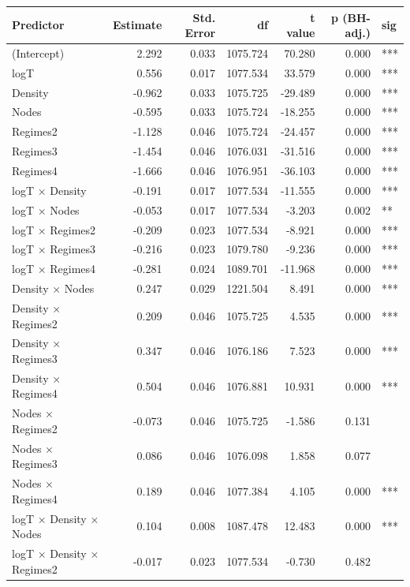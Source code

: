 \begin{table}[ht]
\centering
\begin{tabular}{lrrrrrl}
  \hline
Predictor & Estimate & Std. Error & df & t value & p (BH-adj.) & sig \\ 
  \hline
(Intercept) & 2.292 & 0.033 & 1075.724 & 70.280 & 0.000 & *** \\ 
  logT & 0.556 & 0.017 & 1077.534 & 33.579 & 0.000 & *** \\ 
  Density & -0.962 & 0.033 & 1075.725 & -29.489 & 0.000 & *** \\ 
  Nodes & -0.595 & 0.033 & 1075.724 & -18.255 & 0.000 & *** \\ 
  Regimes2 & -1.128 & 0.046 & 1075.724 & -24.457 & 0.000 & *** \\ 
  Regimes3 & -1.454 & 0.046 & 1076.031 & -31.516 & 0.000 & *** \\ 
  Regimes4 & -1.666 & 0.046 & 1076.951 & -36.103 & 0.000 & *** \\ 
  logT × Density & -0.191 & 0.017 & 1077.534 & -11.555 & 0.000 & *** \\ 
  logT × Nodes & -0.053 & 0.017 & 1077.534 & -3.203 & 0.002 & ** \\ 
  logT × Regimes2 & -0.209 & 0.023 & 1077.534 & -8.921 & 0.000 & *** \\ 
  logT × Regimes3 & -0.216 & 0.023 & 1079.780 & -9.236 & 0.000 & *** \\ 
  logT × Regimes4 & -0.281 & 0.024 & 1089.701 & -11.968 & 0.000 & *** \\ 
  Density × Nodes & 0.247 & 0.029 & 1221.504 & 8.491 & 0.000 & *** \\ 
  Density × Regimes2 & 0.209 & 0.046 & 1075.725 & 4.535 & 0.000 & *** \\ 
  Density × Regimes3 & 0.347 & 0.046 & 1076.186 & 7.523 & 0.000 & *** \\ 
  Density × Regimes4 & 0.504 & 0.046 & 1076.881 & 10.931 & 0.000 & *** \\ 
  Nodes × Regimes2 & -0.073 & 0.046 & 1075.725 & -1.586 & 0.131 &  \\ 
  Nodes × Regimes3 & 0.086 & 0.046 & 1076.098 & 1.858 & 0.077 &  \\ 
  Nodes × Regimes4 & 0.189 & 0.046 & 1077.384 & 4.105 & 0.000 & *** \\ 
  logT × Density × Nodes & 0.104 & 0.008 & 1087.478 & 12.483 & 0.000 & *** \\ 
  logT × Density × Regimes2 & -0.017 & 0.023 & 1077.534 & -0.730 & 0.482 &  \\ 

\end{tabular}
\end{table}
